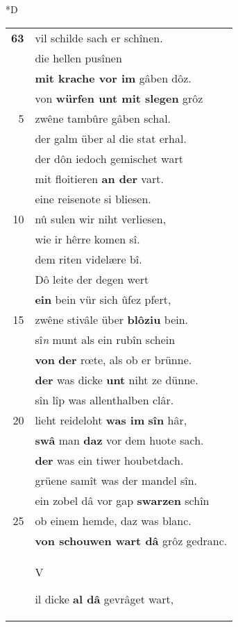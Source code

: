 \documentclass[8pt,a4paper,notitlepage]{article}
\begin{document}
\begin{table}[ht]
\begin{minipage}[t]{0.5\linewidth}
\small
\begin{center}*D
\end{center}
\begin{tabular}{rl}
\textbf{63} & vil schilde sach er schînen.\\ 
 & die hellen pusînen\\ 
 & \textbf{mit krache vor im} gâben dôz.\\ 
 & von \textbf{würfen unt mit slegen} grôz\\ 
5 & zwêne tambûre gâben schal.\\ 
 & der galm über al die stat erhal.\\ 
 & der dôn iedoch gemischet wart\\ 
 & mit floitieren \textbf{an der} vart.\\ 
 & eine reisenote si bliesen.\\ 
10 & nû sulen wir niht verliesen,\\ 
 & wie ir hêrre komen sî.\\ 
 & dem riten videlære bî.\\ 
 & Dô leite der degen wert\\ 
 & \textbf{ein} bein vür sich ûfez pfert,\\ 
15 & zwêne stivâle über \textbf{blôziu} bein.\\ 
 & sî\textit{n} munt als ein rubîn schein\\ 
 & \textbf{von} \textbf{der} rœte, als ob er brünne.\\ 
 & \textbf{der} was dicke \textbf{unt} niht ze dünne.\\ 
 & sîn lîp was allenthalben clâr.\\ 
20 & lieht reideloht \textbf{was im} \textbf{sîn} hâr,\\ 
 & \textbf{swâ} man \textbf{daz} vor dem huote sach.\\ 
 & \textbf{der} was ein tiwer houbetdach.\\ 
 & grüene samît was der mandel sîn.\\ 
 & ein zobel dâ vor gap \textbf{swarzen} schîn\\ 
25 & ob einem hemde, daz was blanc.\\ 
 & \textbf{von schouwen wart dâ} grôz gedranc.\\ 
 & \begin{large}V\end{large}il dicke \textbf{al dâ} gevrâget wart,\\ 

\end{tabular}
\end{minipage}
\end{table}
\end{document}
